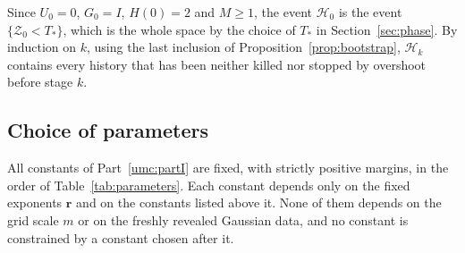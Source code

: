 \documentclass[11pt]{article}
\theoremstyle{definition}
\theoremstyle{remark}
\numberwithin{equation}{section}
\begin{document}
Since $U_0=0$, $G_0=I$, $H(0)=2$ and $M\ge1$, the event
$\mathcal H_0$ is the event $\{\mathcal Z_0<T_*\}$, which is the
whole space by the choice of $T_*$ in Section~\ref{sec:phase}.
By induction on $k$, using the last inclusion of
Proposition~\ref{prop:bootstrap}, $\mathcal H_k$ contains every
history that has been neither killed nor stopped by overshoot before
stage $k$.


\subsection{Choice of parameters}\label{subsec:parameters}
All constants of Part~\ref{umc:partI} are fixed, with strictly positive margins, in
the order of Table~\ref{tab:parameters}. Each constant depends only on
the fixed exponents $\boldsymbol r$ and on the constants listed above
it. None of them depends on the grid scale $m$ or on the freshly
revealed Gaussian data, and no constant is constrained by a constant
chosen after it.
\end{document}
